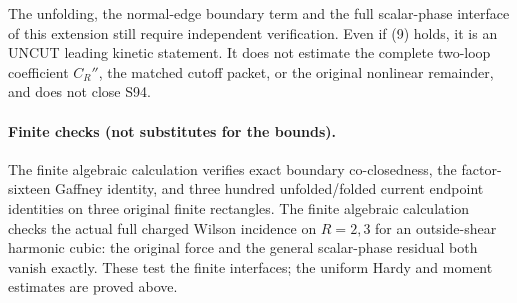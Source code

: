 \documentclass[11pt]{article}
\begin{document}
The unfolding, the normal-edge boundary term and the full scalar-phase
interface of this extension still require independent verification.
Even if (9) holds, it is an UNCUT leading kinetic statement. It does
not estimate the complete two-loop coefficient $C_R''$, the matched
cutoff packet, or the original nonlinear remainder, and does not
close S94.
\paragraph{Finite checks (not substitutes for the bounds).}
The finite algebraic calculation verifies exact boundary
co-closedness, the factor-sixteen Gaffney identity, and three hundred
unfolded/folded current endpoint identities on three original finite
rectangles. The finite algebraic calculation
checks the actual full charged Wilson incidence on $R=2,3$ for an
outside-shear harmonic cubic: the original force and the general
scalar-phase residual both vanish exactly. These test the finite
interfaces; the uniform Hardy and moment estimates are proved above.
\end{document}
